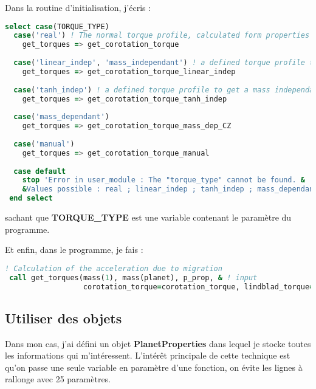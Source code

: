 Dans la routine d'initialisation, j'écris : 
\begin{lstlisting}[language=Fortran]
select case(TORQUE_TYPE)
  case('real') ! The normal torque profile, calculated form properties of the disk
    get_torques => get_corotation_torque
  
  case('linear_indep', 'mass_independant') ! a defined torque profile to get a mass independant convergence zone
    get_torques => get_corotation_torque_linear_indep
  
  case('tanh_indep') ! a defined torque profile to get a mass independant convergence zone
    get_torques => get_corotation_torque_tanh_indep
  
  case('mass_dependant')
    get_torques => get_corotation_torque_mass_dep_CZ
    
  case('manual')
    get_torques => get_corotation_torque_manual
    
  case default
    stop 'Error in user_module : The "torque_type" cannot be found. &
    &Values possible : real ; linear_indep ; tanh_indep ; mass_dependant ; manual'
 end select
\end{lstlisting}
sachant que \textbf{TORQUE\_TYPE} est une variable contenant le paramètre du programme.

Et enfin, dans le programme, je fais : 
\begin{lstlisting}[language=Fortran]
! Calculation of the acceleration due to migration
 call get_torques(mass(1), mass(planet), p_prop, & ! input
                  corotation_torque=corotation_torque, lindblad_torque=lindblad_torque, Gamma_0=torque_ref, ecc_corot=ecc_corot) ! Output
\end{lstlisting}

\subsection{Utiliser des objets}
Dans mon cas, j'ai défini un objet \textbf{PlanetProperties} dans lequel je stocke toutes les informations qui m'intéressent. L'intérêt principale de cette technique est qu'on passe une seule variable en paramètre d'une fonction, on évite les lignes à rallonge avec 25 paramètres. 

